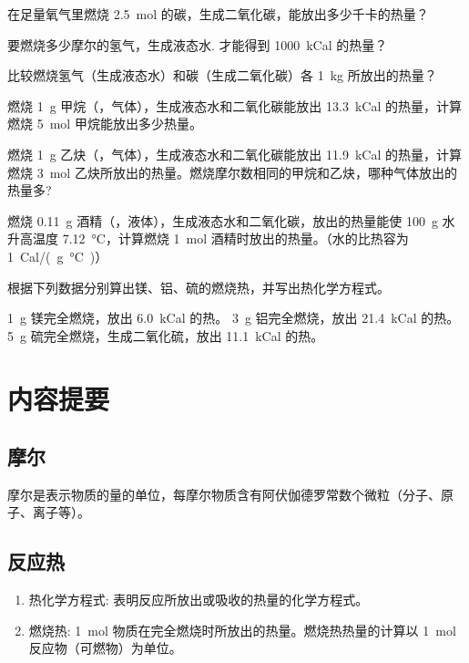 \begin{Practice}[习题]
  \begin{question}
    \item 在足量氧气里燃烧 \qty{2.5}{mol} 的碳，生成二氧化碳，能放出多少千卡的热量？
    \item 要燃烧多少摩尔的氢气，生成液态水. 才能得到 \qty{1000}{kCal} 的热量？
    \item 比较燃烧氢气（生成液态水）和碳（生成二氧化碳）各 \qty{1}{kg} 所放出的热量？
    \item 燃烧 \qty{1}{g} 甲烷（，气体），生成液态水和二氧化碳能放出 \qty{13.3}{kCal} 的热量，计算燃烧 \qty{5}{mol} 甲烷能放出多少热量。
    \item 燃烧 \qty{1}{g} 乙炔（，气体），生成液态水和二氧化碳能放出 \qty{11.9}{kCal} 的热量，计算燃烧 \qty{3}{mol} 乙炔所放出的热量。燃烧摩尔数相同的甲烷和乙炔，哪种气体放出的热量多?
    \item 燃烧 \qty{0.11}{g} 酒精（，液体），生成液态水和二氧化碳，放出的热量能使 \qty{100}{g} 水升高温度 \qty{7.12}{\celsius}，计算燃烧 \qty{1}{mol} 酒精时放出的热量。（水的比热容为 \qty{1}{Cal/(g.\celsius)}）
    \item 根据下列数据分别算出镁、铝、硫的燃烧热，并写出热化学方程式。
    \begin{tasks}
      \task \qty{1}{g} 镁完全燃烧，放出 \qty{6.0 }{kCal} 的热。
      \task \qty{3}{g} 铝完全燃烧，放出 \qty{21.4}{kCal} 的热。
      \task \qty{5}{g} 硫完全燃烧，生成二氧化硫，放出 \qty{11.1}{kCal} 的热。
    \end{tasks}
  \end{question}
\end{Practice}

\section*{内容提要}
\setcounter{subsection}{0}
\subsection{摩尔}
摩尔是表示物质的量的单位，每摩尔物质含有阿伏伽德罗常数个微粒（分子、原子、离子等）。


\subsection{反应热}
\begin{enumerate}
  \item 热化学方程式: 表明反应所放出或吸收的热量的化学方程式。
  \item 燃烧热: \qty{1}{mol} 物质在完全燃烧时所放出的热量。燃烧热热量的计算以 \qty{1}{mol} 反应物（可燃物）为单位。
\end{enumerate}

